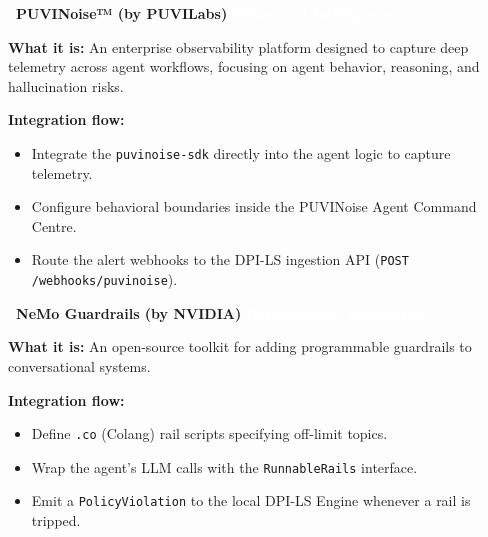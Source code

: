\documentclass[11pt,a4paper]{article}
\begin{document}
\vspace{0.5cm}
\noindent\textbf{\large \faChartLine\ PUVINoise™ (by PUVILabs)} \quad \colorbox{dpicloud}{\textcolor{white}{\small \textbf{Behavioral Intelligence}}}\\[0.2cm]
\begin{tcolorbox}[enhanced, colback=white, colframe=dpicloud, boxrule=0pt, leftrule=3pt, sharp corners, top=2mm, bottom=2mm]
\textbf{What it is:} An enterprise observability platform designed to capture deep telemetry across agent workflows, focusing on agent behavior, reasoning, and hallucination risks.

\textbf{Integration flow:}
\begin{itemize}
    \item[\textcolor{dpicloud}{\textbf{1.}}] Integrate the \texttt{puvinoise-sdk} directly into the agent logic to capture telemetry.
    \item[\textcolor{dpicloud}{\textbf{2.}}] Configure behavioral boundaries inside the PUVINoise Agent Command Centre.
    \item[\textcolor{dpicloud}{\textbf{3.}}] Route the alert webhooks to the DPI-LS ingestion API (\texttt{POST /webhooks/puvinoise}).
\end{itemize}
\end{tcolorbox}

\vspace{0.5cm}
\noindent\textbf{\large \faRoute\ NeMo Guardrails (by NVIDIA)} \quad \colorbox{dpiteal}{\textcolor{white}{\small \textbf{Deterministic Boundaries}}}\\[0.2cm]
\begin{tcolorbox}[enhanced, colback=white, colframe=dpiteal, boxrule=0pt, leftrule=3pt, sharp corners, top=2mm, bottom=2mm]
\textbf{What it is:} An open-source toolkit for adding programmable guardrails to conversational systems.

\textbf{Integration flow:}
\begin{itemize}
    \item[\textcolor{dpiteal}{\textbf{1.}}] Define \texttt{.co} (Colang) rail scripts specifying off-limit topics.
    \item[\textcolor{dpiteal}{\textbf{2.}}] Wrap the agent's LLM calls with the \texttt{RunnableRails} interface.
    \item[\textcolor{dpiteal}{\textbf{3.}}] Emit a \texttt{PolicyViolation} to the local DPI-LS Engine whenever a rail is tripped.
\end{itemize}
\end{tcolorbox}
\end{document}
